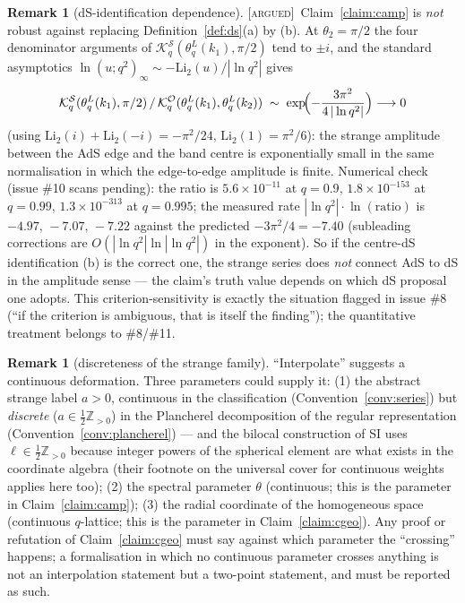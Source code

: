 \documentclass[11pt,a4paper]{article}
\newcommand{\ARGUED}{{\color{orange}\textsc{[argued]}}}
\theoremstyle{definition}
\newtheorem{remark}[definition]{Remark}
\theoremstyle{plain}
\newcommand{\Z}{\mathbb{Z}}
\renewcommand{\O}{\mathcal{O}}                  %
\newcommand{\K}{\mathcal{K}}                    %
\begin{document}
\begin{remark}[dS-identification dependence]\label{rem:dsdependence}
\ARGUED\ Claim~\ref{claim:camp} is \emph{not} robust against replacing
Definition~\ref{def:ds}(a) by (b). At $\theta_2=\pi/2$ the four denominator arguments of
$\K^{\mathcal{S}}_{q}(\theta^{L}_{q}(k_1),\pi/2)$ tend to $\pm i$, and the standard asymptotics
$\ln(u;q^{2})_{\infty}\sim-\mathrm{Li}_2(u)/|\ln q^{2}|$ gives
\[
\K^{\mathcal{S}}_{q}(\theta^{L}_{q}(k_1),\pi/2)\,/\,
\K^{\O}_{q}(\theta^{L}_{q}(k_1),\theta^{L}_{q}(k_2))
\;\sim\;\exp\!\Bigl(-\frac{3\pi^{2}}{4\,|\ln q^{2}|}\Bigr)\longrightarrow 0
\]
(using $\mathrm{Li}_2(i)+\mathrm{Li}_2(-i)=-\pi^{2}/24$, $\mathrm{Li}_2(1)=\pi^{2}/6$):
the strange amplitude between the AdS edge and the band centre is exponentially small in the
same normalisation in which the edge-to-edge amplitude is finite. Numerical check (issue \#10
scans pending): the ratio is $5.6\times10^{-11}$ at $q=0.9$, $1.8\times10^{-153}$ at $q=0.99$,
$1.3\times10^{-313}$ at $q=0.995$; the measured rate $|\ln q^{2}|\cdot\ln(\mathrm{ratio})$ is
$-4.97,\,-7.07,\,-7.22$ against the predicted $-3\pi^{2}/4=-7.40$ (subleading corrections are
$O(|\ln q^{2}|\ln|\ln q^{2}|)$ in the exponent). So if the centre-dS identification
(b) is the correct one, the strange series does \emph{not} connect AdS to dS in the amplitude
sense --- the claim's truth value depends on which dS proposal one adopts. This
criterion-sensitivity is exactly the situation flagged in issue \#8 (``if the criterion is
ambiguous, that is itself the finding''); the quantitative treatment belongs to \#8/\#11.
\end{remark}

\begin{remark}[discreteness of the strange family]\label{rem:discreteness}
``Interpolate'' suggests a continuous deformation. Three parameters could supply it:
(1) the abstract strange label $a>0$, continuous in the classification
(Convention~\ref{conv:series}) but \emph{discrete} ($a\in\tfrac12\Z_{>0}$) in the Plancherel
decomposition of the regular representation (Convention~\ref{conv:plancherel}) --- and the
bilocal construction of SI uses $\ell\in\tfrac12\Z_{>0}$ because integer powers of the spherical
element are what exists in the coordinate algebra (their footnote on the universal cover for
continuous weights applies here too);
(2) the spectral parameter $\theta$ (continuous; this is the parameter in
Claim~\ref{claim:camp});
(3) the radial coordinate of the homogeneous space (continuous $q$-lattice; this is the
parameter in Claim~\ref{claim:cgeo}).
Any proof or refutation of Claim~\ref{claim:cgeo} must say against which parameter the
``crossing'' happens; a formalisation in which no continuous parameter crosses anything is not
an interpolation statement but a two-point statement, and must be reported as such.
\end{remark}
\end{document}
